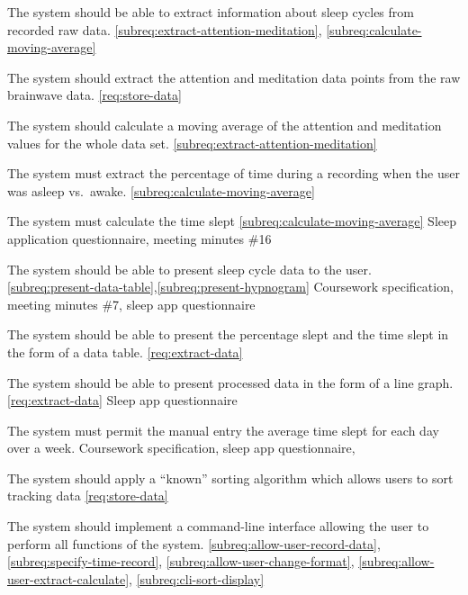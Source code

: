 {The system should be able to extract information about sleep cycles from recorded raw data.}
{\phigh}
{\ref{subreq:extract-attention-meditation}, \ref{subreq:calculate-moving-average}}
{}

{The system should extract the attention and meditation data points from the raw brainwave data.}
{\phigh}
{\ref{req:store-data}}
{}

{The system should calculate a moving average of the attention and meditation values for the whole
  data set.}
{\phigh}
{\ref{subreq:extract-attention-meditation}}
{}

{The system must extract the percentage of time during a recording when the user was asleep vs.\
  awake.}
{\phigh}
{\ref{subreq:calculate-moving-average}}
{}

{The system must calculate the time slept}
{\phigh}
{\ref{subreq:calculate-moving-average}}
{Sleep application questionnaire, meeting minutes \#16}

{The system should be able to present sleep cycle data to the user.}
{\phigh}
{\ref{subreq:present-data-table},\ref{subreq:present-hypnogram}}
{Coursework specification, meeting minutes \#7, sleep app questionnaire}

{The system should be able to present the percentage slept and the time slept in the form of a data table.}
{\phigh}
{\ref{req:extract-data}}
{}

{The system should be able to present processed data in the form of a line graph.}
{\phigh}
{\ref{req:extract-data}}
{Sleep app questionnaire}

{The system must permit the manual entry the average time slept for each day over a week.}
{\pmed}
{\dnone}
{Coursework specification, sleep app questionnaire, \textcite{British-Medical-Association:2018aa}}

{The system should apply a ``known'' sorting algorithm which allows users to sort tracking data}
{\pmed}
{\ref{req:store-data}}
{\sspec}

{The system should implement a command-line interface allowing the user to perform all functions
  of the system.}
{\phigh}
{\ref{subreq:allow-user-record-data}, \ref{subreq:specify-time-record},
  \ref{subreq:allow-user-change-format}, \ref{subreq:allow-user-extract-calculate},
  \ref{subreq:cli-sort-display}}
{}

